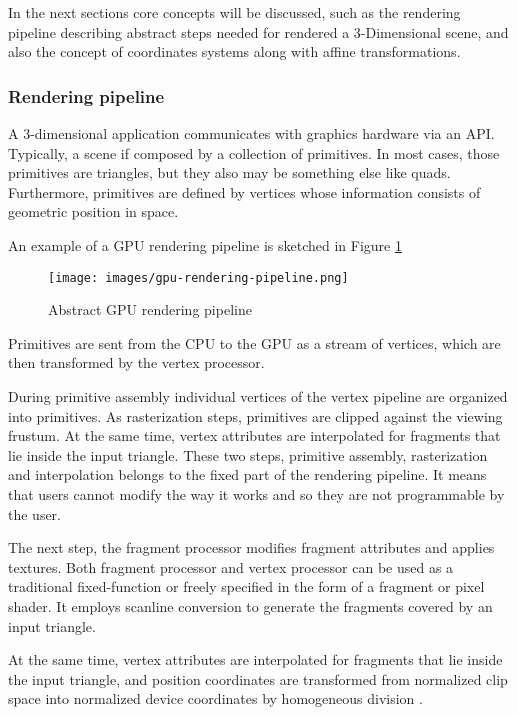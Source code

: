 \documentclass[12pt,a4paper]{extarticle}
\newcommand{\linespace}{\vspace{0pt}}
\begin{document}
In the next sections core concepts will be discussed, such as the rendering pipeline describing abstract steps needed for rendered a 3-Dimensional scene, and also the concept of coordinates systems along with affine transformations. 

\subsubsection{Rendering pipeline} 
A 3-dimensional application communicates with graphics hardware via an API. Typically, a scene if composed by a collection of primitives. In most cases, those primitives are triangles, but they also may be something else like quads.
Furthermore, primitives are defined by vertices whose information consists of geometric position in space.

An example of a GPU rendering pipeline is sketched in Figure \ref{fig:renderingpipeline} 

\begin{figure}[hbtp]

\centering
\texttt{[image: images/gpu-rendering-pipeline.png]}
\caption{Abstract GPU rendering pipeline}
\label{fig:renderingpipeline}
\end{figure}

Primitives are sent from the CPU to the GPU as a stream of vertices, which are then transformed by the vertex processor.

During primitive assembly individual vertices of the vertex pipeline are organized into primitives. As rasterization steps, primitives are clipped against the viewing frustum. At the same time, vertex attributes are interpolated for fragments that lie inside the input triangle. These two steps, primitive assembly, rasterization and interpolation belongs to the fixed part of the rendering pipeline. It means that users cannot modify the way it works and so they are not programmable by the user.

The next step, the fragment processor modifies fragment attributes and applies textures.
Both fragment processor and vertex processor can be used as a traditional fixed-function or freely specified in the form of a fragment or pixel shader. It employs scanline conversion to generate the fragments covered by an input triangle.


At the same time, vertex attributes are interpolated for fragments that lie inside the input triangle, and position coordinates are transformed from normalized clip space into normalized device coordinates by homogeneous division \cite{weiskopf_2006:1}.
\linespace
\end{document}
